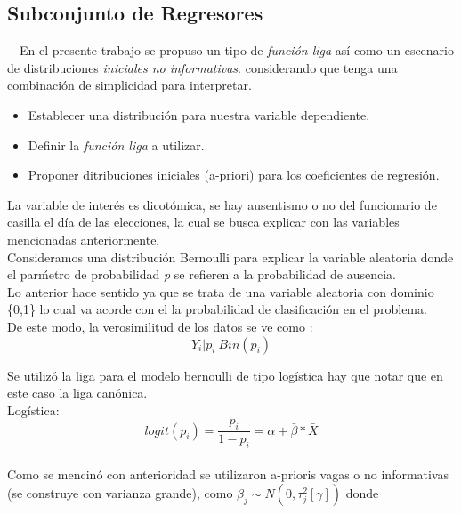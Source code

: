 \documentclass[DIV=calc, 
					paper=letter, 
					fontsize=11pt, 
					twocolumn]{scrartcl}
\begin{document}
\subsection{Subconjunto de Regresores}

~~En el presente trabajo se propuso un tipo de \textit{funci\'on liga} as\'i como un escenario de distribuciones \textit{iniciales no informativas}. considerando que tenga una combinaci\'on de simplicidad para interpretar. \\

\begin{itemize}
    \item Establecer una distribuci\'on para nuestra variable dependiente.
   	\item Definir la \textit{funci\'on liga} a utilizar.
	\item Proponer ditribuciones iniciales (a-priori) para los coeficientes de regresi\'on.  
\end{itemize}

La variable de inter\'es es dicot\'omica, se hay ausentismo o no del funcionario de casilla el d\'ia de las elecciones, la cual se busca explicar con las variables mencionadas anteriormente.\\

Consideramos una distribuci\'on Bernoulli para explicar la variable aleatoria donde el par\'metro de probabilidad \textit{p} se refieren a la probabilidad de ausencia.\\

Lo anterior hace sentido ya que se trata de una variable aleatoria con dominio \{0,1\} lo cual va acorde con el la probabilidad de clasificaci\'on en el problema.\\

De este modo, la verosimilitud de los datos se ve como :\\

\begin{equation}
Y_i|p_i~Bin(p_i)
\end{equation}

Se utiliz\'o la liga para el modelo bernoulli de tipo log\'istica hay que notar que en este caso la liga can\'onica.\\

Log\'istica:
\begin{equation}
logit(p_i) = \frac{p_i}{1-p_i} = \alpha+\bar{\beta}*\bar{X}
\end{equation}\\

Como se mencin\'o con anterioridad se utilizaron a-prioris vagas o no informativas (se construye con varianza grande), como $\beta_j \sim N(0,\tau_{j}^{2}{[\gamma]})$ donde 
\end{document}
